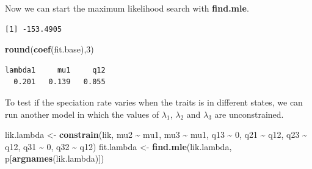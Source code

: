 \documentclass[
]{book}
\newenvironment{Shaded}{\begin{snugshade}}{\end{snugshade}}
\newcommand{\DecValTok}[1]{\textcolor[rgb]{0.00,0.00,0.81}{#1}}
\newcommand{\KeywordTok}[1]{\textcolor[rgb]{0.13,0.29,0.53}{\textbf{#1}}}
\newcommand{\NormalTok}[1]{#1}
\newcommand{\OperatorTok}[1]{\textcolor[rgb]{0.81,0.36,0.00}{\textbf{#1}}}
\newcommand{\StringTok}[1]{\textcolor[rgb]{0.31,0.60,0.02}{#1}}
\begin{document}
Now we can start the maximum likelihood search with \textbf{find.mle}.

\begin{Shaded}
\end{Shaded}

\begin{verbatim}
[1] -153.4905
\end{verbatim}

\begin{Shaded}
\begin{Highlighting}[]
\KeywordTok{round}\NormalTok{(}\KeywordTok{coef}\NormalTok{(fit.base),}\DecValTok{3}\NormalTok{)}
\end{Highlighting}
\end{Shaded}

\begin{verbatim}
lambda1     mu1     q12 
  0.201   0.139   0.055 
\end{verbatim}

To test if the speciation rate varies when the traits is in different states, we can run another model in which the values of \(\lambda_{1}\), \(\lambda_{2}\) and \(\lambda_{3}\) are unconstrained.

\begin{Shaded}
\begin{Highlighting}[]
\NormalTok{lik.lambda \textless{}{-}}\StringTok{ }\KeywordTok{constrain}\NormalTok{(lik, mu2 }\OperatorTok{\textasciitilde{}}\StringTok{ }\NormalTok{mu1, mu3 }\OperatorTok{\textasciitilde{}}\StringTok{ }\NormalTok{mu1,}
\NormalTok{                        q13 }\OperatorTok{\textasciitilde{}}\StringTok{ }\DecValTok{0}\NormalTok{, q21 }\OperatorTok{\textasciitilde{}}\StringTok{ }\NormalTok{q12, }
\NormalTok{                        q23 }\OperatorTok{\textasciitilde{}}\StringTok{ }\NormalTok{q12, q31 }\OperatorTok{\textasciitilde{}}\StringTok{ }\DecValTok{0}\NormalTok{, q32 }\OperatorTok{\textasciitilde{}}\StringTok{ }\NormalTok{q12)}
\NormalTok{fit.lambda \textless{}{-}}\StringTok{ }\KeywordTok{find.mle}\NormalTok{(lik.lambda, p[}\KeywordTok{argnames}\NormalTok{(lik.lambda)])}
\end{Highlighting}
\end{Shaded}
\end{document}
